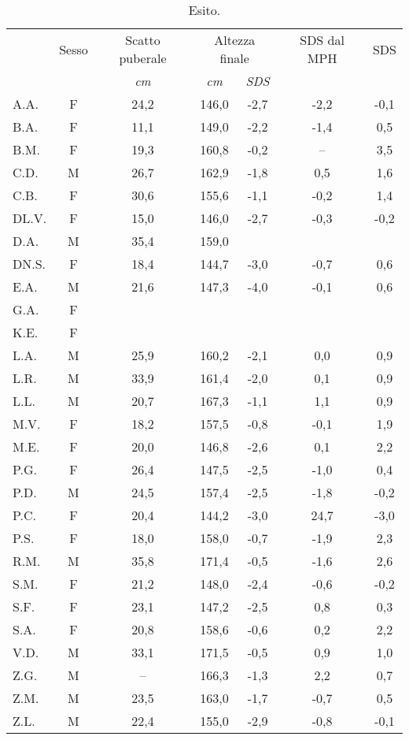 \begin{table}[!h]
\begin{center}
\begin{tabular}{lcccccc}
\toprule
 & Sesso  & Scatto puberale & \multicolumn{2}{c}{Altezza finale} 	& SDS dal MPH	& \Delta SDS \\
\cmidrule(r){4-5}
  & & \emph{cm} & \emph{cm} 	& \emph{SDS}  	   	&		& 			 	\\
\midrule
A.A.	& F & 24,2 & 146,0 & -2,7  & -2,2  & -0,1    \\
B.A.	& F & 11,1 & 149,0 & -2,2  & -1,4  & 0,5     \\
B.M.	& F & 19,3 & 160,8 & -0,2  & --    & 3,5     \\
C.D.	& M & 26,7 & 162,9 & -1,8  & 0,5   & 1,6     \\
C.B.	& F & 30,6 & 155,6 & -1,1  & -0,2  & 1,4     \\
DL.V.	& F & 15,0 & 146,0 & -2,7  & -0,3  & -0,2    \\
D.A.	& M & 35,4 & 159,0 &       &       &         \\
DN.S.	& F & 18,4 & 144,7 & -3,0  & -0,7  & 0,6     \\
E.A.	& M & 21,6 & 147,3 & -4,0  & -0,1  & 0,6     \\
G.A.	& F &      &       &       &       &         \\
K.E.	& F &      &       &       &       &         \\
L.A.	& M & 25,9 & 160,2 & -2,1  & 0,0   & 0,9     \\
L.R.	& M & 33,9 & 161,4 & -2,0  & 0,1   & 0,9     \\
L.L.	& M & 20,7 & 167,3 & -1,1  & 1,1   & 0,9     \\
M.V.	& F & 18,2 & 157,5 & -0,8  & -0,1  & 1,9     \\
M.E.	& F & 20,0 & 146,8 & -2,6  & 0,1   & 2,2     \\
P.G.	& F & 26,4 & 147,5 & -2,5  & -1,0  & 0,4     \\
P.D.	& M & 24,5 & 157,4 & -2,5  & -1,8  & -0,2    \\
P.C.	& F & 20,4 & 144,2 & -3,0  & 24,7  & -3,0    \\
P.S.	& F & 18,0 & 158,0 & -0,7  & -1,9  & 2,3     \\
R.M.	& M & 35,8 & 171,4 & -0,5  & -1,6  & 2,6    \\
S.M.	& F & 21,2 & 148,0 & -2,4  & -0,6  & -0,2    \\
S.F.	& F & 23,1 & 147,2 & -2,5  & 0,8   & 0,3     \\
S.A.	& F & 20,8 & 158,6 & -0,6  & 0,2   & 2,2     \\
V.D.	& M & 33,1 & 171,5 & -0,5  & 0,9   & 1,0     \\
Z.G.	& M & --   & 166,3 & -1,3  & 2,2   & 0,7   \\
Z.M.	& M & 23,5 & 163,0 & -1,7  & -0,7  & 0,5     \\
Z.L.	& M & 22,4 & 155,0 & -2,9  & -0,8  & -0,1    \\
\bottomrule
\end{tabular}
\end{center}
\caption{Esito.}
\label{tab:Esito}
\end{table}

